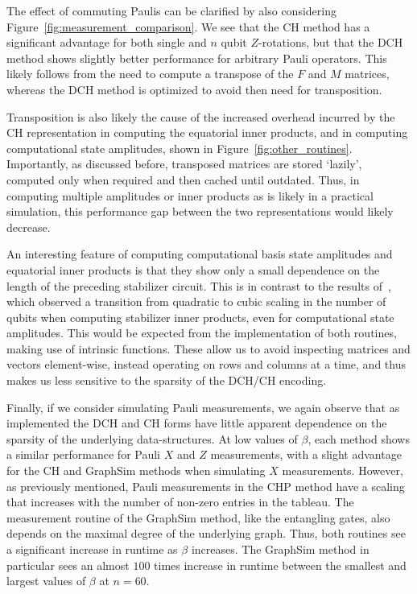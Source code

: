 The effect of commuting Paulis can be clarified by also considering Figure~\ref{fig:measurement_comparison}. We see that the CH method has a significant advantage for both single and $n$ qubit $Z$-rotations, but that the DCH method shows slightly better performance for arbitrary Pauli operators. This likely follows from the need to compute a transpose of the $F$ and $M$ matrices, whereas the DCH method is optimized to avoid then need for transposition.\par
Transposition is also likely the cause of the increased overhead incurred by the CH representation in computing the equatorial inner products, and in computing computational state amplitudes, shown in Figure~\ref{fig:other_routines}. Importantly, as discussed before, transposed matrices are stored `lazily', computed only when required and then cached until outdated. Thus, in computing multiple amplitudes or inner products as is likely in a practical simulation, this performance gap between the two representations would likely decrease.\par
An interesting feature of computing computational basis state amplitudes and equatorial inner products is that they show only a small dependence on the length of the preceding stabilizer circuit. This is in contrast to the results of~\cite{Garcia2012}, which observed a transition from quadratic to cubic scaling in the number of qubits when computing stabilizer inner products, even for computational state amplitudes. This would be expected from the implementation of both routines, making use of intrinsic functions. These allow us to avoid inspecting matrices and vectors element-wise, instead operating on rows and columns at a time, and thus makes us less sensitive to the sparsity of the DCH/CH encoding.\par 
Finally, if we consider simulating Pauli measurements, we again observe that as implemented the DCH and CH forms have little apparent dependence on the sparsity of the underlying data-structures. At low values of $\beta$, each method shows a similar performance for Pauli $X$ and $Z$ measurements, with a slight advantage for the CH and GraphSim methods when simulating $X$ measurements. However, as previously mentioned, Pauli measurements in the CHP method have a scaling that increases with the number of non-zero entries in the tableau. The measurement routine of the GraphSim method, like the entangling gates, also depends on the maximal degree of the underlying graph. Thus, both routines see a significant increase in runtime as $\beta$ increases. The GraphSim method in particular sees an almost $100$ times increase in runtime between the smallest and largest values of $\beta$ at $n=60$.\par
